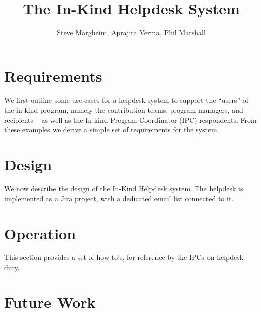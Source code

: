 \documentclass[authoryear,toc]{lsstdoc}
\title{The In-Kind Helpdesk System}
\author{%
Steve Margheim, 
Aprajita Verma,
Phil Marshall
}
\date{\vcsDate}
\begin{document}
\maketitle



\section{Requirements} \label{sec:reqs}

We first outline some use cases for a helpdesk system to support the ``users'' of the in-kind program, namely the contribution teams, program managers, and recipients -- as well as the In-kind Program Coordinator (IPC) respondents. 
From these examples we derive a simple set of requirements for the system.


\section{Design} \label{sec:design}

We now describe the design of the In-Kind Helpdesk system. 
The helpdesk is implemented as a Jira project, with a dedicated email list connected to it.



\section{Operation} \label{sec:operation}

This section provides a set of how-to's, for reference by the IPCs on helpdesk duty.


\section{Future Work} \label{sec:future}
 
\end{document}
